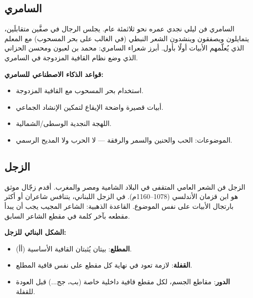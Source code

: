 \begin{otherlanguage}{arabic}
\subsection*{السامري}

السامري فن ليلي نجدي عمره نحو ثلاثمئة عام. يجلس الرجال في صفَّين متقابلَين، يتمايلون ويصفقون وينشدون الشعر النبطي (في الغالب على بحر المسحوب) مع المعلم الذي يُعلّمهم الأبيات أولًا بأول. أبرز شعراء السامري: محمد بن لعبون ومحسن الحزاني الذي وضع نظام القافية المزدوجة في السامري.

\textbf{قواعد الذكاء الاصطناعي للسامري:}
\begin{itemize}
  \item استخدام بحر المسحوب مع القافية المزدوجة.
  \item أبيات قصيرة واضحة الإيقاع لتمكين الإنشاد الجماعي.
  \item اللهجة النجدية الوسطى/الشمالية.
  \item الموضوعات: الحب والحنين والسمر والرفقة — لا الحرب ولا المديح الرسمي.
\end{itemize}

\subsection*{الزجل}

الزجل فن الشعر العامي المتقفى في البلاد الشامية ومصر والمغرب. أقدم زجّال موثق هو ابن قزمان الأندلسي (1078–1160م). في الزجل اللبناني، يتنافس شاعران أو أكثر بارتجال الأبيات على نفس الموضوع. القاعدة الذهبية: الشاعر المجيب يجب أن يبدأ مقطعه بآخر كلمة في مقطع الشاعر السابق.

\textbf{الشكل البنائي للزجل:}
\begin{itemize}
  \item \textbf{المطلع}: بيتان يُثبتان القافية الأساسية (أأ).
  \item \textbf{القفلة}: لازمة تعود في نهاية كل مقطع على نفس قافية المطلع.
  \item \textbf{الدور}: مقاطع الجسم، لكل مقطع قافية داخلية خاصة (بب، جج...) قبل العودة للقفلة.
\end{itemize}

\end{otherlanguage}
